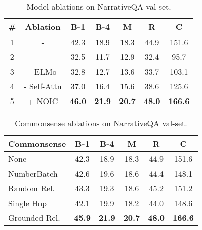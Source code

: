 \documentclass[11pt,a4paper]{article}
\newcommand{\fullModel}{NOIC}
\begin{document}
\begin{table}
	\centering
    \begin{small}
    \begin{tabular}{ccccccc}\toprule
    \textbf{\#} & \textbf{Ablation} & \textbf{B-1} & \textbf{B-4} & \textbf{M} & \textbf{R} & \textbf{C}\\
    \midrule
    1 & - & 42.3 & 18.9 & 18.3 & 44.9 & 151.6 \\
    2 &  & 32.5 & 11.7 & 12.9 & 32.4 & 95.7 \\
    3 & - ELMo & 32.8 & 12.7 & 13.6 &  33.7 & 103.1 \\
    4 & - Self-Attn & 37.0 & 16.4 & 15.6 & 38.6 & 125.6 \\
    5 & + \fullModel & \bf 46.0 & \bf 21.9 & \bf 20.7 & \bf 48.0 & \bf 166.6 \\
    \bottomrule
    \end{tabular}
    \end{small}
    \caption{Model ablations on NarrativeQA val-set.}
    \label{tab:model_ablations}
\end{table}
 \begin{table}
	\centering
    \begin{small}
    \begin{tabular}{lccccc}\toprule
    \textbf{Commonsense} & \textbf{B-1} & \textbf{B-4} & \textbf{M} & \textbf{R} & \textbf{C} \\
    \midrule
    None & 42.3 & 18.9 & 18.3 & 44.9 & 151.6 \\
    NumberBatch & 42.6 & 19.6 & 18.6 & 44.4 & 148.1 \\
    Random Rel. & 43.3 & 19.3 & 18.6 & 45.2 & 151.2 \\
    Single Hop & 42.1 & 19.9 & 18.2 & 44.0 & 148.6 \\
    Grounded Rel. & \bf 45.9 & \bf 21.9 & \bf 20.7 & \bf 48.0 & \bf 166.6\\
    \bottomrule
    \end{tabular}
    \end{small}
    \vspace{-5pt}
    \caption{Commonsense ablations on NarrativeQA val-set.}
    \label{tab:commonsense_abl_exps}
    \vspace{-10pt}
\end{table}
\end{document}
